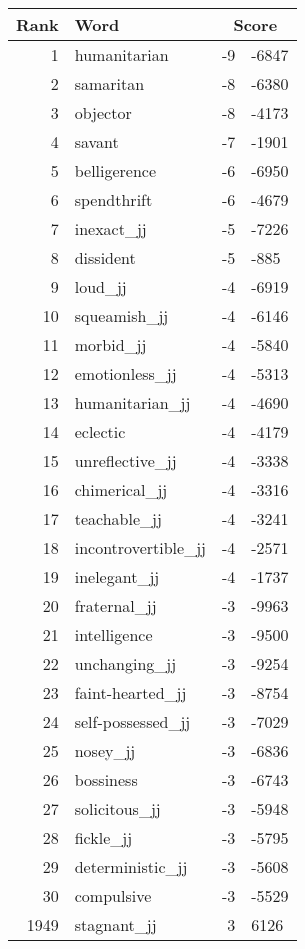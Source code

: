 \begin{longtable}[!htbp]{| rlr@{.}l |}
    \hline
    \textbf{Rank} & \textbf{Word} & \multicolumn{2}{c|}{\textbf{Score}} \\
    \hline
    \endhead
    1 & humanitarian & -9 & -6847 \\
    2 & samaritan & -8 & -6380 \\
    3 & objector & -8 & -4173 \\
    4 & savant & -7 & -1901 \\
    5 & belligerence & -6 & -6950 \\
    6 & spendthrift & -6 & -4679 \\
    7 & inexact\_jj & -5 & -7226 \\
    8 & dissident & -5 & -885 \\
    9 & loud\_jj & -4 & -6919 \\
    10 & squeamish\_jj & -4 & -6146 \\
    11 & morbid\_jj & -4 & -5840 \\
    12 & emotionless\_jj & -4 & -5313 \\
    13 & humanitarian\_jj & -4 & -4690 \\
    14 & eclectic & -4 & -4179 \\
    15 & unreflective\_jj & -4 & -3338 \\
    16 & chimerical\_jj & -4 & -3316 \\
    17 & teachable\_jj & -4 & -3241 \\
    18 & incontrovertible\_jj & -4 & -2571 \\
    19 & inelegant\_jj & -4 & -1737 \\
    20 & fraternal\_jj & -3 & -9963 \\
    21 & intelligence & -3 & -9500 \\
    22 & unchanging\_jj & -3 & -9254 \\
    23 & faint-hearted\_jj & -3 & -8754 \\
    24 & self-possessed\_jj & -3 & -7029 \\
    25 & nosey\_jj & -3 & -6836 \\
    26 & bossiness & -3 & -6743 \\
    27 & solicitous\_jj & -3 & -5948 \\
    28 & fickle\_jj & -3 & -5795 \\
    29 & deterministic\_jj & -3 & -5608 \\
    30 & compulsive & -3 & -5529 \\
    1949 & stagnant\_jj & 3 & 6126 \\

\end{longtable}
